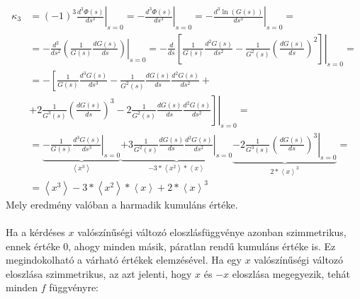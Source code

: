 \begin{align}
    \kappa_{3}
    &=
    \left( -1 \right)^{3} \left. \frac{d^{3} \Phi \left( s \right)}{d s^{3}} \right\rvert_{s = 0}
    =
    - \left. \frac{d^{3} \Phi \left( s \right)}{d s^{3}} \right\rvert_{s = 0}
    =
    - \left. \frac{d^{3} \ln \left( G \left( s \right) \right)}{d s^{3}} \right\rvert_{s = 0}
    = \nonumber \\
    &=
    - \left. \frac{d^{2}}{d s^{2}}
    \left(
    \frac{1}{G \left( s \right)} \frac{d G \left( s \right)}{d s}
    \right) \right\rvert_{s = 0}
    =
    - \left. \frac{d}{d s}
    \left[
    \frac{1}{G \left( s \right)} \frac{d^{2} G \left( s \right)}{d s^{2}}
    -
    \frac{1}{G^{2} \left( s \right)} \left( \frac{d G \left( s \right)}{d s} \right)^{2}
    \right] \right\rvert_{s = 0}
    = \nonumber \\
    &=
    - \left[
    \frac{1}{G \left( s \right)} \frac{d^{3} G \left( s \right)}{d s^{3}}
    -
    \frac{1}{G^{2} \left( s \right)} \frac{d G \left( s \right)}{d s} \frac{d^{2} G \left( s \right)}{d s^{2}}
    \right.
    + \nonumber \\
    &+
    \left. \left.
    2 \frac{1}{G^{3} \left( s \right)} \left( \frac{d G \left( s \right)}{d s} \right)^{3}
    -
    2 \frac{1}{G^{2} \left( s \right)} \frac{d G \left( s \right)}{d s} \frac{d^{2} G \left( s \right)}{d s^{2}}
    \right] \right\rvert_{s = 0}
    = \nonumber \\
    &=
    \underbrace{-
    \left. \frac{1}{G \left( s \right)} \frac{d^{3} G \left( s \right)}{d s^{3}}\right\rvert_{s = 0}
    }_{\left< x^{3} \right>}
    \underbrace{
    +
    \left. 3 \frac{1}{G^{2} \left( s \right)} \frac{d G \left( s \right)}{d s} \frac{d^{2} G \left( s \right)}{d s^{2}} \right\rvert_{s = 0}
    }_{- 3 * \left< x^{2} \right> * \left< x \right>}
    \underbrace{
    -
    \left. 2 \frac{1}{G^{3} \left( s \right)} \left( \frac{d G \left( s \right)}{d s} \right)^{3} \right\rvert_{s = 0}
    }_{2 * \left< x \right>^{3}}
    = \nonumber \\
    &=
    \boxed{\left< x^{3} \right> - 3 * \left< x^{2} \right> * \left< x \right> + 2 * \left< x \right>^{3}}
\end{align}
Mely eredmény valóban a harmadik kumuláns értéke.
\\ \\
Ha a kérdéses $x$ valószínűségi változó eloszlásfüggvénye azonban szimmetrikus, ennek értéke $0$, ahogy minden másik, páratlan rendű kumuláns értéke is. Ez megindokolható a várható értékek elemzésével. Ha egy $x$ valószínűségi változó eloszlása szimmetrikus, az azt jelenti, hogy $x$ és $-x$ eloszlása megegyezik, tehát minden $f$ függvényre:

